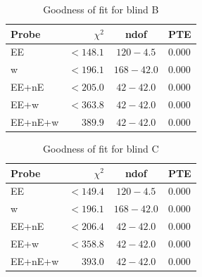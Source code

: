 \begin{table}
	\begin{center}
		\caption{Goodness of fit for blind B}
		\label{tab:goodness-of-fit}
\begin{tabular}{lrcl}
    \toprule
    Probe             & $\chi^2$       & ndof       & PTE   \\
    \midrule
	EE               & $< 148.1$ & $120-4.5$ & 0.000 \\
	w                & $< 196.1$ & $168-42.0$ & 0.000 \\
	EE+nE            & $< 205.0$ & $ 42-42.0$ & 0.000 \\
	EE+w             & $< 363.8$ & $ 42-42.0$ & 0.000 \\
	EE+nE+w          & $389.9$ & $ 42-42.0$ & 0.000 \\

    \bottomrule
\end{tabular}
	\end{center}
\end{table}

\begin{table}
	\begin{center}
		\caption{Goodness of fit for blind C}
		\label{tab:goodness-of-fit}
\begin{tabular}{lrcl}
    \toprule
    Probe             & $\chi^2$       & ndof       & PTE   \\
    \midrule
	EE               & $< 149.4$ & $120-4.5$ & 0.000 \\
	w                & $< 196.1$ & $168-42.0$ & 0.000 \\
	EE+nE            & $< 206.4$ & $ 42-42.0$ & 0.000 \\
	EE+w             & $< 358.8$ & $ 42-42.0$ & 0.000 \\
	EE+nE+w          & $393.0$ & $ 42-42.0$ & 0.000 \\

    \bottomrule
\end{tabular}
	\end{center}
\end{table}

